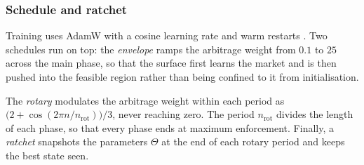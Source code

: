 \subsubsection*{Schedule and ratchet}

Training uses AdamW \cite{loshchilov2019} with a cosine learning rate and warm restarts
\cite{loshchilov2017}. Two schedules run on top: the \emph{envelope} ramps the arbitrage weight from $0.1$ to $25$ across the main phase, so that the
surface first learns the market and is then pushed into the feasible region rather than being
confined to it from initialisation.

The \emph{rotary} modulates the arbitrage weight within each period as
$\bigl(2+\cos(2\pi n/n_{\mathrm{rot}})\bigr)/3$, never reaching zero. The period $n_{\mathrm{rot}}$
divides the length of each phase, so that every phase ends at maximum enforcement. Finally, a \emph{ratchet} snapshots the parameters $\Theta$ at the end of each rotary period and keeps the best state seen. 



